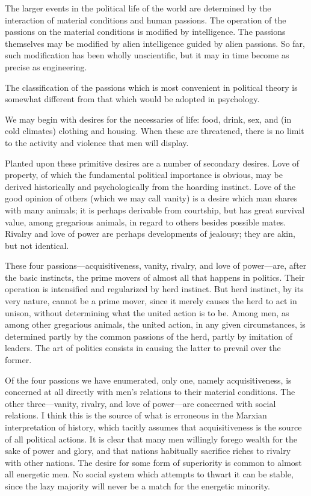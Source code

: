 The larger events in the political life of the world are determined by the interaction of material conditions and human passions. The operation of the passions on the material conditions is modified by intelligence. The passions themselves may be modified by alien intelligence guided by alien passions. So far, such modification has been wholly unscientific, but it may in time become as precise as engineering.

The classification of the passions which is most convenient in political theory is somewhat different from that which would be adopted in psychology.

We may begin with desires for the necessaries of life: food, drink, sex, and (in cold climates) clothing and housing. When these are threatened, there is no limit to the activity and violence that men will display.

Planted upon these primitive desires are a number of secondary desires. Love of property, of which the fundamental political importance is obvious, may be derived historically and psychologically from the hoarding instinct. Love of the good opinion of others (which we may call vanity) is a desire which man shares with many animals; it is perhaps derivable from courtship, but has great survival value, among gregarious animals, in regard to others besides possible mates. Rivalry and love of power are perhaps developments of jealousy; they are akin, but not identical.

These four passions---acquisitiveness, vanity, rivalry, and love of power---are, after the basic instincts, the prime movers of almost all that happens in politics. Their operation is intensified and regularized by herd instinct. But herd instinct, by its very nature, cannot be a prime mover, since it merely causes the herd to act in unison, without determining what the united action is to be. Among men, as among other gregarious animals, the united action, in any given circumstances, is determined partly by the common passions of the herd, partly by imitation of leaders. The art of politics consists in causing the latter to prevail over the former.

Of the four passions we have enumerated, only one, namely acquisitiveness, is concerned at all directly with men's relations to their material conditions. The other three---vanity, rivalry, and love of power---are concerned with social relations. I think this is the source of what is erroneous in the Marxian interpretation of history, which tacitly assumes that acquisitiveness is the source of all political actions. It is clear that many men willingly forego wealth for the sake of power and glory, and that nations habitually sacrifice riches to rivalry with other nations. The desire for some form of superiority is common to almost all energetic men. No social system which attempts to thwart it can be stable, since the lazy majority will never be a match for the energetic minority.


